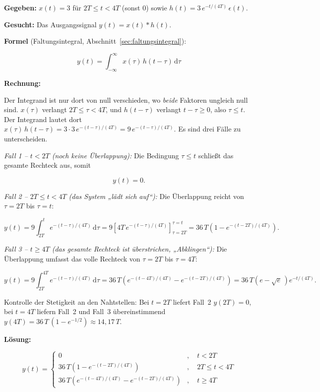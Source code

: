 \begin{beispiel}

\textbf{Gegeben:} $x(t) = 3$ für $2T \leq t < 4T$ (sonst $0$) sowie
$h(t) = 3\, e^{-t/(4T)}\, \epsilon(t)$.

\textbf{Gesucht:} Das Ausgangssignal $y(t) = x(t) * h(t)$.

\textbf{Formel} (Faltungsintegral, Abschnitt~\ref{sec:faltungsintegral}):

$$
y(t) = \int_{-\infty}^{\infty} x(\tau)\, h(t - \tau)\,\mathrm{d}\tau
$$

\textbf{Rechnung:}

Der Integrand ist nur dort von null verschieden, wo \emph{beide} Faktoren
ungleich null sind. $x(\tau)$ verlangt $2T \leq \tau < 4T$, und
$h(t - \tau)$ verlangt $t - \tau \geq 0$, also $\tau \leq t$. Der Integrand
lautet dort $x(\tau)\,h(t-\tau) = 3 \cdot 3\, e^{-(t-\tau)/(4T)} = 9\, e^{-(t-\tau)/(4T)}$.
Es sind drei Fälle zu unterscheiden.

\emph{Fall 1 -- $t < 2T$ (noch keine Überlappung):} Die Bedingung $\tau \leq t$
schließt das gesamte Rechteck aus, somit

$$
y(t) = 0.
$$

\emph{Fall 2 -- $2T \leq t < 4T$ (das System „lädt sich auf``):}
Die Überlappung reicht von $\tau = 2T$ bis $\tau = t$:

$$
y(t) = 9 \int_{2T}^{t} e^{-(t-\tau)/(4T)}\,\mathrm{d}\tau
     = 9 \left[4T\, e^{-(t-\tau)/(4T)}\right]_{\tau = 2T}^{\tau = t}
     = 36\,T\left(1 - e^{-(t - 2T)/(4T)}\right).
$$

\emph{Fall 3 -- $t \geq 4T$ (das gesamte Rechteck ist überstrichen, „Abklingen``):}
Die Überlappung umfasst das volle Rechteck von $\tau = 2T$ bis $\tau = 4T$:

$$
y(t) = 9 \int_{2T}^{4T} e^{-(t-\tau)/(4T)}\,\mathrm{d}\tau
     = 36\,T\left(e^{-(t - 4T)/(4T)} - e^{-(t - 2T)/(4T)}\right)
     = 36\,T\left(e - \sqrt{e}\,\right) e^{-t/(4T)}.
$$

Kontrolle der Stetigkeit an den Nahtstellen: Bei $t = 2T$ liefert Fall~2
$y(2T) = 0$, bei $t = 4T$ liefern Fall~2 und Fall~3 übereinstimmend
$y(4T) = 36\,T\,(1 - e^{-1/2}) \approx 14{,}17\,T$. \checkmark

\textbf{Lösung:}

$$
\boxed{\;y(t) = \begin{cases}
0 & , \quad t < 2T \\[4pt]
36\,T\left(1 - e^{-(t - 2T)/(4T)}\right) & , \quad 2T \leq t < 4T \\[4pt]
36\,T\left(e^{-(t - 4T)/(4T)} - e^{-(t - 2T)/(4T)}\right) & , \quad t \geq 4T
\end{cases}\;}
$$


\end{beispiel}
